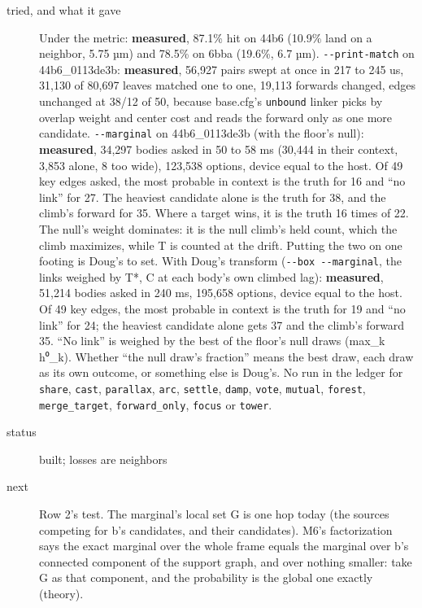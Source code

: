 \begin{description}
\item[{tried, and what it gave}] Under the metric: \textbf{measured}, 87.1\% hit on 44b6 (10.9\% land on a neighbor, 5.75 µm) and 78.5\% on 6bba (19.6\%, 6.7 µm). \texttt{-\allowbreak{}-\allowbreak{}print-\allowbreak{}match} on 44b6\_\allowbreak{}0113de3b: \textbf{measured}, 56,927 pairs swept at once in 217 to 245 us, 31,130 of 80,697 leaves matched one to one, 19,113 forwards changed, edges unchanged at 38/12 of 50, because base.cfg's \texttt{unbound} linker picks by overlap weight and center cost and reads the forward only as one more candidate. \texttt{-\allowbreak{}-\allowbreak{}marginal} on 44b6\_\allowbreak{}0113de3b (with the floor's null): \textbf{measured}, 34,297 bodies asked in 50 to 58 ms (30,444 in their context, 3,853 alone, 8 too wide), 123,538 options, device equal to the host. Of 49 key edges asked, the most probable in context is the truth for 16 and “no link” for 27. The heaviest candidate alone is the truth for 38, and the climb's forward for 35. Where a target wins, it is the truth 16 times of 22. The null's weight dominates: it is the null climb's held count, which the climb maximizes, while T is counted at the drift. Putting the two on one footing is Doug's to set. With Doug's transform (\texttt{-\allowbreak{}-\allowbreak{}box -\allowbreak{}-\allowbreak{}marginal}, the links weighed by T*, C at each body's own climbed lag): \textbf{measured}, 51,214 bodies asked in 240 ms, 195,658 options, device equal to the host. Of 49 key edges, the most probable in context is the truth for 19 and “no link” for 24; the heaviest candidate alone gets 37 and the climb's forward 35. “No link” is weighed by the best of the floor's null draws (max\_\allowbreak{}k h⁰\_\allowbreak{}k). Whether “the null draw's fraction” means the best draw, each draw as its own outcome, or something else is Doug's. No run in the ledger for \texttt{share}, \texttt{cast}, \texttt{parallax}, \texttt{arc}, \texttt{settle}, \texttt{damp}, \texttt{vote}, \texttt{mutual}, \texttt{forest}, \texttt{merge\_\allowbreak{}target}, \texttt{forward\_\allowbreak{}only}, \texttt{focus} or \texttt{tower}.
\item[{status}] built; losses are neighbors
\item[{next}] Row 2's test. The marginal's local set G is one hop today (the sources competing for b's candidates, and their candidates). M6's factorization says the exact marginal over the whole frame equals the marginal over b's connected component of the support graph, and over nothing smaller: take G as that component, and the probability is the global one exactly (theory).
\end{description}

